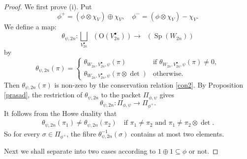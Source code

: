 \documentclass[article]{article}
\numberwithin{equation}{section}
\theoremstyle{definition}
\DeclareMathOperator{\SP}{Sp}
\DeclareMathOperator{\Irrt}{Irr_{temp}}
\begin{document}
\begin{proof}
We first prove (i). Put $$\phi^{+}=(\phi\otimes\chi_{V})\oplus\chi_{V},\quad  \phi^{-}=(\phi\otimes\chi_{V})-\chi_{V}.$$ 
 We define a map:
	$$
	\theta_{\psi,2n}: \bigsqcup_{V_{2n}^\bullet} \Irrt \left(\mathrm O(V_{2n}^{\bullet})\right)\longrightarrow \Irrt \left(\SP(W_{2n})\right) 
	$$
	by 
	$$
	\theta_{\psi,2n}(\pi)=
	\begin{cases}
	\theta_{W_{2n}, V_{2n}^\bullet, \psi}(\pi) \quad &\mbox{if}\,\,\theta_{W_{2n}, V_{2n}^\bullet,  \psi}(\pi)\neq 0, \\
	\theta_{W_{2n}, V_{2n}^\bullet,  \psi}(\pi\otimes\det) &\mbox{otherwise}.
	\end{cases}
	$$
	Then $\theta_{\psi,2n}(\pi)$ is non-zero by the conservation relation \ref{con2}. By Proposition \ref{prasad}, the restriction of $\theta_{\psi,2n}$ to the packet $\Pi_{\phi,\psi}$ gives 
	\begin{equation}\label{theta2n}
	\theta_{\psi,2n}: \Pi_{\phi,\psi} \longrightarrow \Pi_{\phi^{+}}.
	\end{equation}
	It follows from the Howe duality that
	\begin{align}\label{15}
	\theta_{\psi,2n}(\pi_1)\neq \theta_{\psi,2n}(\pi_2)\quad  \mbox{if}\,\, \pi_1\neq \pi_2\,\, \mbox{and}\,\, \pi_1 \neq \pi_2\otimes \det.
	\end{align}
	So for every $\sigma \in \Pi_{\phi^{+}}$, 
	the fibre $\theta_{\psi,2n}^{-1}(\sigma)$ contains at most two elements. 
	
	Next we shall separate into two cases according to $\mathrm{1}\oplus\mathrm{1}
	\subseteq \phi$ or not.  


\end{proof}
\end{document}
